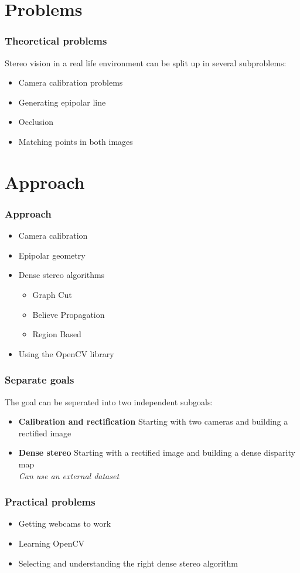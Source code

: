 \documentclass{article}
\begin{document}
\section{Problems}

 \frametitle{Theoretical problems}
   Stereo vision in a real life environment can be split up in several subproblems:
   \begin{itemize}
    \item Camera calibration problems
    \item Generating epipolar line
    \item Occlusion
    \item Matching points in both images
   \end{itemize}

\section{Approach}

  \frametitle{Approach}
  \begin{itemize}
    \item Camera calibration
    \item Epipolar geometry
     \item Dense stereo algorithms
      \begin{itemize}
       \item Graph Cut
       \item Believe Propagation
       \item Region Based
      \end{itemize}
    \item Using the OpenCV library
  \end{itemize}

  \frametitle{Separate goals}
  The goal can be seperated into two independent subgoals:

  \begin{itemize}
   \item \textbf{Calibration and rectification} Starting with two cameras and building a rectified image
   \item \textbf{Dense stereo} Starting with a rectified image and building a dense disparity map \\ \textit{Can use an external dataset}
  \end{itemize}

  \frametitle{Practical problems}
  \begin{itemize}
   \item Getting webcams to work
   \item Learning OpenCV
   \item Selecting and understanding the right dense stereo algorithm
  \end{itemize}
\end{document}
